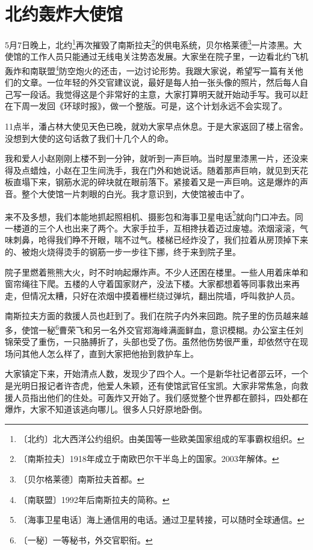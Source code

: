 \documentclass[12pt,UTF-8,openany]{ctexbook}
\begin{document}
\chapter{北约轰炸大使馆}

\begin{Large}
    
    5月7日晚上，北约\footnote{〔北约〕北大西洋公约组织。由美国等一些欧美国家组成的军事霸权组织。}再次摧毁了南斯拉夫\footnote{〔南斯拉夫〕1918年成立于南欧巴尔干半岛上的国家。2003年解体。}的供电系统，贝尔格莱德\footnote{〔贝尔格莱德〕南斯拉夫首都。}一片漆黑。大使馆的工作人员只能通过无线电关注势态发展。大家坐在院子里，一边看北约飞机轰炸和南联盟\footnote{〔南联盟〕1992年后南斯拉夫的简称。}防空炮火的还击，一边讨论形势。我跟大家说，希望写一篇有关他们的文章。一位年轻的外交官建议说，最好是每人拍一张头像的照片，然后每人自己写一段话。我觉得这是个非常好的主意，大家打算明天就开始动手写。我可以赶在下周一发回《环球时报》，做一个整版。可是，这个计划永远不会实现了。
    
    11点半，潘占林大使见天色已晚，就劝大家早点休息。于是大家返回了楼上宿舍。没想到大使的这句话救了我们十几个人的命。
    
    我和爱人小赵刚刚上楼不到一分钟，就听到一声巨响。当时屋里漆黑一片，还没来得及点蜡烛，小赵在卫生间洗手，我在门外和她说话。随着那声巨响，就见到天花板直塌下来，钢筋水泥的碎块就在眼前落下。紧接着又是一声巨响。这是爆炸的声音。整个大使馆一片刺眼的白光。我才意识到，大使馆被击中了。
    
    来不及多想，我们本能地抓起照相机、摄影包和海事卫星电话\footnote{〔海事卫星电话〕海上通信用的电话。通过卫星转接，可以随时全球通信。}就向门口冲去。同一楼道的三个人也出来了两个。大家手拉手，互相搀扶着迈过废墟。浓烟滚滚，气味刺鼻，呛得我们睁不开眼，喘不过气。楼梯已经炸没了，我们拉着从房顶掉下来的、被炮火烧得烫手的钢筋一步一步往下挪，终于来到院子里。
    
    院子里燃着熊熊大火，时不时响起爆炸声。不少人还困在楼里。一些人用着床单和窗帘绳往下爬。五楼的人守着国家财产，没法下楼。大家都想着等同事救出来再走，但情况太糟，只好在浓烟中摸着栅栏绕过弹坑，翻出院墙，呼叫救护人员。
    
    南斯拉夫方面的救援人员也赶到了。我们在院子内外来回跑。院子里的伤员越来越多，使馆一秘\footnote{〔一秘〕一等秘书，外交官职衔。}曹荣飞和另一名外交官郑海峰满面鲜血，意识模糊。办公室主任刘锦荣受了重伤，一只胳膊折了，头部也受了伤。虽然他伤势很严重，却依然守在现场问其他人怎么样了，直到大家把他抬到救护车上。
    
    大家镇定下来，开始清点人数，发现少了四个人。一个是新华社记者邵云环，一个是光明日报记者许杏虎，他爱人朱颖，还有使馆武官任宝凯。大家非常焦急，向救援人员指出他们的住处。可轰炸又开始了。我们感觉整个世界都在颤抖，四处都在爆炸，大家不知道该逃向哪儿。很多人只好原地卧倒。
    

\end{Large}
\end{document}
